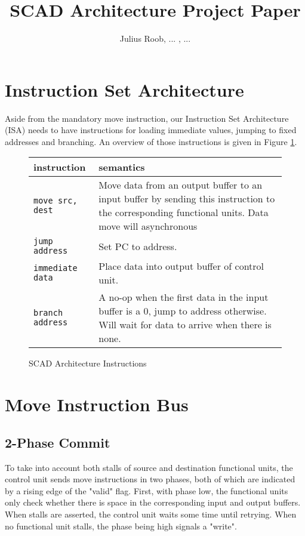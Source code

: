 \documentclass[adraft]{eptcs}
\title{SCAD Architecture Project Paper}
\author{Julius Roob, ...
	\institute{University of Kaiserslautern, Embedded Systems Group}
	\email{julius@juliusroob.de}, ...
}
\begin{document}
	\maketitle \newpage
	\tableofcontents \newpage
	\listoftodos \newpage
	
	\section{Instruction Set Architecture}
		Aside from the mandatory move instruction, our Instruction Set Architecture (ISA) needs to have instructions for loading immediate values, jumping to fixed addresses and branching.
		An overview of those instructions is given in Figure \ref{fig:instruction_table}.
		
		\begin{figure}[!ht]
			\begin{center}
				\begin{tabular}{| l | p{7cm} |}
					\hline
					\textbf{instruction} & \textbf{semantics} \\ \hline
					\lstinline{move src, dest} & Move data from an output buffer to an input buffer by sending this instruction to the corresponding functional units. Data move will asynchronous \\ \hline
					\lstinline{jump address} & Set PC to address. \\ \hline
					\lstinline{immediate data} & Place data into output buffer of control unit. \\ \hline
					\lstinline{branch address} & A no-op when the first data in the input buffer is a 0, jump to address otherwise. Will wait for data to arrive when there is none. \\ \hline
				\end{tabular}
				\label{fig:instruction_table}
				\caption{SCAD Architecture Instructions}
			\end{center}
		\end{figure}
		
	\section{Move Instruction Bus}
		\subsection{2-Phase Commit}
			To take into account both stalls of source and destination functional units, the control unit sends move instructions in two phases, both of which are indicated by a rising edge of the "valid" flag.
			First, with phase low, the functional units only check whether there is space in the corresponding input and output buffers.
			When stalls are asserted, the control unit waits some time until retrying.
			When no functional unit stalls, the phase being high signals a "write".
			
\end{document}
